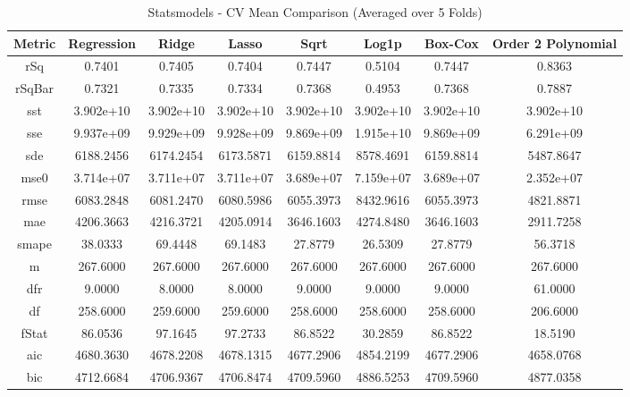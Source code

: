 \documentclass{article}
\begin{document}
\begin{table}[H]
\centering
\caption{Statsmodels - CV Mean Comparison (Averaged over 5 Folds)}
\label{tab:Statsmodels - CV Mean Comparison}
\begin{tabular}{|c|c|c|c|c|c|c|c|} \hline
Metric & Regression & Ridge & Lasso & Sqrt & Log1p & Box-Cox & Order 2 Polynomial \\\hline \hline
rSq & 0.7401 & 0.7405 & 0.7404 & 0.7447 & 0.5104 & 0.7447 & 0.8363 \\\hline
rSqBar & 0.7321 & 0.7335 & 0.7334 & 0.7368 & 0.4953 & 0.7368 & 0.7887 \\\hline
sst & 3.902e+10 & 3.902e+10 & 3.902e+10 & 3.902e+10 & 3.902e+10 & 3.902e+10 & 3.902e+10 \\\hline
sse & 9.937e+09 & 9.929e+09 & 9.928e+09 & 9.869e+09 & 1.915e+10 & 9.869e+09 & 6.291e+09 \\\hline
sde & 6188.2456 & 6174.2454 & 6173.5871 & 6159.8814 & 8578.4691 & 6159.8814 & 5487.8647 \\\hline
mse0 & 3.714e+07 & 3.711e+07 & 3.711e+07 & 3.689e+07 & 7.159e+07 & 3.689e+07 & 2.352e+07 \\\hline
rmse & 6083.2848 & 6081.2470 & 6080.5986 & 6055.3973 & 8432.9616 & 6055.3973 & 4821.8871 \\\hline
mae & 4206.3663 & 4216.3721 & 4205.0914 & 3646.1603 & 4274.8480 & 3646.1603 & 2911.7258 \\\hline
smape & 38.0333 & 69.4448 & 69.1483 & 27.8779 & 26.5309 & 27.8779 & 56.3718 \\\hline
m & 267.6000 & 267.6000 & 267.6000 & 267.6000 & 267.6000 & 267.6000 & 267.6000 \\\hline
dfr & 9.0000 & 8.0000 & 8.0000 & 9.0000 & 9.0000 & 9.0000 & 61.0000 \\\hline
df & 258.6000 & 259.6000 & 259.6000 & 258.6000 & 258.6000 & 258.6000 & 206.6000 \\\hline
fStat & 86.0536 & 97.1645 & 97.2733 & 86.8522 & 30.2859 & 86.8522 & 18.5190 \\\hline
aic & 4680.3630 & 4678.2208 & 4678.1315 & 4677.2906 & 4854.2199 & 4677.2906 & 4658.0768 \\\hline
bic & 4712.6684 & 4706.9367 & 4706.8474 & 4709.5960 & 4886.5253 & 4709.5960 & 4877.0358 \\\hline
\end{tabular}
\end{table}
\end{document}
